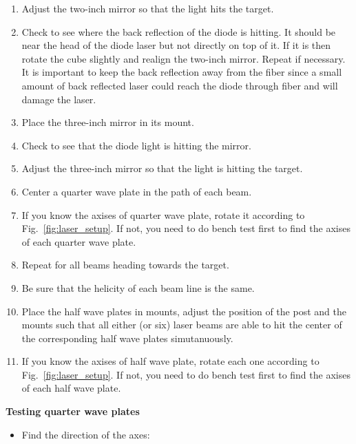 {\begin{enumerate}
\begin{itemize}
\item Rotate the quarter wave plate forty-five degrees.
\end{itemize}
\item Adjust the two-inch mirror so that the light hits the target.
\item Check to see where the back reflection of the diode is hitting. It
  should be near the head of the diode laser but not directly on top of
  it. If it is then rotate the cube slightly and realign the two-inch
  mirror. Repeat if necessary.  It is important to keep the back reflection
  away from the fiber since a small amount of back reflected laser could reach 
  the diode through fiber and will damage the laser.
\item Place the three-inch mirror in its mount.
\item Check to see that the diode light is hitting the mirror.
\item Adjust the three-inch mirror so that the light is hitting the
  target.
\item Center a quarter wave plate in the path of each beam.
\item If you know the axises of quarter wave plate, rotate it according to 
      Fig.~\ref{fig:laser_setup}.  If not, you need to do bench test first to 
      find the axises of each quarter wave plate.
\item Repeat for all beams heading towards the target.
\item Be sure that the helicity of each beam line is the same.
\item Place the half wave plates in mounts, adjust the position of the post 
      and the mounts such that all either (or six) laser beams are able to 
      hit the center of the corresponding half wave plates simutanuously.
\item If you know the axises of half wave plate, rotate each one according 
      to Fig.~\ref{fig:laser_setup}. If not, you need to do bench test first to 
      find the axises of each half wave plate.
\end{enumerate}

\medskip
\noindent
{\bf{Testing quarter wave plates}}

\begin{itemize}
\item Find the direction of the axes:


\end{itemize}}
